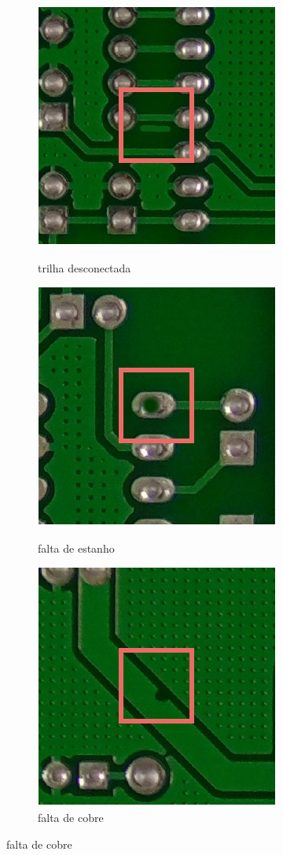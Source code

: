 \begin{figure}[h!]
    \centering
    \caption{Tipos de defeito de fabricação em placas de circuito impresso.}
    \begin{subfigure}[H]{0.3\textwidth}
        \centering
        \caption{trilha desconectada}
        \includegraphics[scale=0.6]{img/img-fundamentacao-defeitos.pdf}
        \label{fig:fund-defeitos1}
    \end{subfigure}
    \begin{subfigure}[H]{0.3\textwidth}
        \centering
        \caption{falta de estanho}
        \includegraphics[scale=0.6]{img/img-fundamentacao-defeitos2.pdf}
        \label{fig:fund-defeitos2}
    \end{subfigure}
    \begin{subfigure}[H]{0.3\textwidth}
        \centering
        \caption{falta de cobre}
        \includegraphics[scale=0.6]{img/img-fundamentacao-defeitos3.pdf}

\end{subfigure}
\end{figure}
